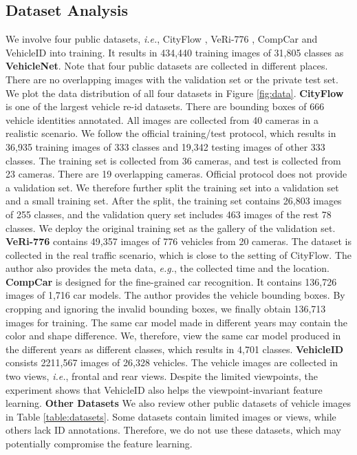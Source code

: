 \documentclass[journal]{IEEEtran}
\def\eg{\emph{e.g.}}
\def\ie{\emph{i.e.}}
\begin{document}
\subsection{Dataset Analysis} \label{sec:data-analysis}
We involve four public datasets, \ie, CityFlow \cite{tang@cityflow}, VeRi-776 \cite{liu2016deep}, CompCar \cite{yang2015large} and VehicleID \cite{liu2016pku} into training. It results in 434,440 training images of  31,805 classes as \textbf{VehicleNet}. Note that four public datasets are collected in different places. There are no overlapping images with the validation set or the private test set. We plot the data distribution of all four datasets in Figure \ref{fig:data}. 
\textbf{CityFlow} \cite{tang@cityflow} is one of the largest vehicle re-id datasets. There are bounding boxes of 666 vehicle identities annotated. All images are collected from 40 cameras in a realistic scenario. We follow the official training/test protocol, which results in 36,935 training images of 333 classes and 19,342 testing images of other 333 classes. The training set is collected from 36 cameras, and test is collected from 23 cameras. There are 19 overlapping cameras. Official protocol does not provide a validation set. We therefore further split the training set into a validation set and a small training set. After the split, the training set contains 26,803 images of 255 classes, and the validation query set includes 463 images of the rest 78 classes. We deploy the original training set as the gallery of the validation set.  \textbf{VeRi-776} \cite{liu2016deep} contains 49,357 images of 776 vehicles from 20 cameras. The dataset is collected in the real traffic scenario, which is close to the setting of CityFlow. The author also provides the meta data, \eg, the collected time and the location. \textbf{CompCar} \cite{yang2015large} is designed for the fine-grained car recognition. It contains 136,726 images of 1,716 car models. The author provides the vehicle bounding boxes. By cropping and ignoring the invalid bounding boxes, we finally obtain 136,713 images for training. The same car model made in different years may contain the color and shape difference. We, therefore, view the same car model produced in the different years as different classes, which results in 4,701 classes. \textbf{VehicleID} \cite{liu2016pku} consists 2211,567 images of 26,328 vehicles. The vehicle images are collected in two views, \ie, frontal and rear views. Despite the limited viewpoints, the experiment shows that VehicleID also helps the viewpoint-invariant feature learning. 
\textbf{Other Datasets} We also review other public datasets of vehicle images in Table \ref{table:datasets}. Some datasets contain limited images or views, while others lack ID annotations. Therefore, we do not use these datasets, which may potentially compromise the feature learning.
\end{document}
